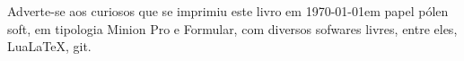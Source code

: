 \pagebreak

\ifodd\thepage\blankpage\fi

\mbox{}\vfill


\begin{center}
		\begin{minipage}{.7\textwidth}\tiny\noindent{}
		\centering\tiny
		Adverte-se aos curiosos que se imprimiu este 
		livro
		em \today em papel pólen soft, em tipologia Minion Pro e Formular, 
		com diversos sofwares livres, 
		entre eles, Lua\LaTeX, git.\\ 
		\medskip\\\
		\end{minipage}
\end{center}